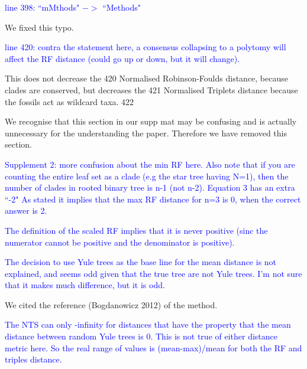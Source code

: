 \documentclass[11pt]{letter}
\begin{document}
\begin{letter}{}


\textcolor{blue}{line 398: ``mMthods" $->$ ``Methods"}

We fixed this typo.

\textcolor{blue}{line 420: contra the statement here, a consensus collapsing to a polytomy will affect the RF distance (could go up or down, but it will change).}


This does not decrease the 420
Normalised Robinson-Foulds distance, because clades are conserved, but decreases the 421
Normalised Triplets distance because the fossils act as wildcard taxa. 422





We recognise that this section in our supp mat may be confusing and is actually unnecessary for the understanding the paper. Therefore we have removed this section. %

\textcolor{blue}{Supplement 2:}
\textcolor{blue}{more confusion about the min RF here. Also note that if you are counting the entire leaf set as a clade (e.g the star tree having N=1), then the number of clades in rooted binary tree is n-1 (not n-2). Equation 3 has an extra ``-2" As stated it implies that the max RF distance for n=3 is 0, when the correct answer is 2.}



\textcolor{blue}{The definition of the scaled RF implies that it is never positive (sinc the numerator cannot be positive and the denominator is positive).}



\textcolor{blue}{The decision to use Yule trees as the base line for the mean distance is not explained, and seems odd given that the true tree are not Yule trees. I'm not sure that it makes much difference, but it is odd.}

We cited the reference (Bogdanowicz 2012) of the method.


\textcolor{blue}{The NTS can only -infinity for distances that have the property that the mean distance between random Yule trees is 0. This is not true of either distance metric here. So the real range of values is (mean-max)/mean for both the RF and triples distance.}


\end{letter}
\end{document}
